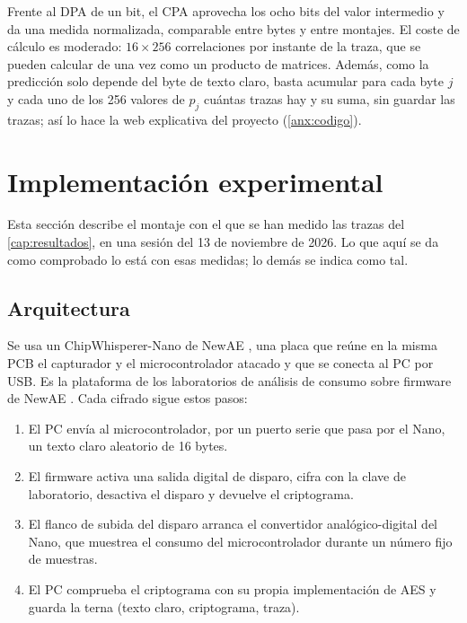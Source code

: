 Frente al DPA de un bit, el CPA aprovecha los ocho bits del valor intermedio y
da una medida normalizada, comparable entre bytes y entre montajes. El coste de
cálculo es moderado: $16 \times 256$ correlaciones por instante de la traza,
que se pueden calcular de una vez como un producto de matrices. Además, como la
predicción solo depende del byte de texto claro, basta acumular para cada byte
$j$ y cada uno de los 256 valores de $p_j$ cuántas trazas hay y su suma, sin
guardar las trazas; así lo hace la web explicativa del proyecto
(\cref{anx:codigo}).

\section{Implementación experimental}
\label{sec:implementacion}

Esta sección describe el montaje con el que se han medido las trazas del
\cref{cap:resultados}, en una sesión del 13 de noviembre de 2026. Lo que aquí
se da como comprobado lo está con esas medidas; lo demás se indica como tal.

\subsection{Arquitectura}

Se usa un ChipWhisperer-Nano de NewAE \cite{cw-nano,cw-nano-docs}, una placa
que reúne en la misma PCB el capturador y el microcontrolador atacado y que se
conecta al PC por USB. Es la plataforma de los laboratorios de análisis de
consumo sobre firmware de NewAE \cite{cw-lab-dpa,cw-lab-cpa}. Cada cifrado
sigue estos pasos:

\begin{enumerate}
  \item El PC envía al microcontrolador, por un puerto serie que pasa por el
    Nano, un texto claro aleatorio de 16 bytes.
  \item El firmware activa una salida digital de disparo, cifra con la clave de
    laboratorio, desactiva el disparo y devuelve el criptograma.
  \item El flanco de subida del disparo arranca el convertidor analógico-digital
    del Nano, que muestrea el consumo del microcontrolador durante un número
    fijo de muestras.
  \item El PC comprueba el criptograma con su propia implementación de AES y
    guarda la terna (texto claro, criptograma, traza).
\end{enumerate}

